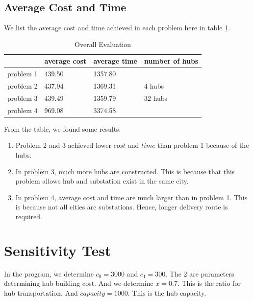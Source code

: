 \documentclass[11pt, a4paper]{article} %
\begin{document}
\subsection{Average Cost and Time}
We list the average cost and time achieved in each problem here in table \ref{tb:aveCT}. 
\begin{table}[H]
	\centering
	\begin{tabular}{|l|l|l|l|}
		\hline
		               &average cost     &  average time & number of hubs\\
		               \hline
		problem 1      &439.50                  &   1357.80& \\
		\hline
		problem 2      &437.94                  &   1369.31& 4 hubs\\
		\hline
		problem 3      &439.49                  &   1359.79& 32 hubs\\
		\hline
		problem 4      &969.08                  &   3374.58& \\
		\hline
	\end{tabular}
	\caption{Overall Evaluation}
	\label{tb:aveCT}
\end{table}

\indent From the table, we found some results:
\begin{enumerate}
	\item Problem 2 and 3 achieved lower $cost$ and $time$ than problem 1 because of the hubs. 
	\item In problem 3, much more hubs are constructed. This is because that this problem allows hub and substation exist in the same city.
	\item In problem 4, average cost and time are much larger than in problem 1. This is because not all cities are substations. Hence, longer delivery route is required.
\end{enumerate}

\section{Sensitivity Test}
In the program, we determine $c_0=3000$ and $c_1=300$. The 2 are parameters determining hub building cost. And we determine $x=0.7$. This is the ratio for hub transportation. And $capacity=1000$. This is the hub capacity.
\end{document}
